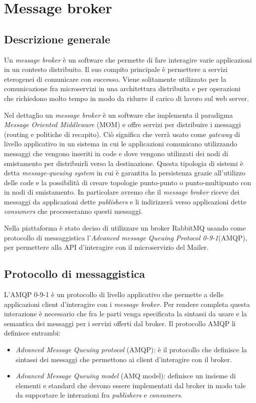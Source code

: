 \section{Message broker}
\subsection{Descrizione generale}
Un \textit{message broker} è un software che permette di fare interagire varie applicazioni in
un contesto distribuito. Il suo compito principale è permettere a servizi eterogenei di comunicare con successo.
Viene solitamente utilizzato per la comunicazione fra microservizi in una architettura distribuita
e per operazioni che richiedono molto tempo in modo da ridurre il carico di lavoro sul web server.

Nel dettaglio un \textit{message broker} è un software che implementa il paradigma \textit{Message Oriented Middleware} (MOM) e offre servizi per distribuire i messaggi (routing e politiche di recapito).
Ciò significa che verrà usato come \textit{gateway} di livello applicativo in un sistema in cui le applicazioni comunicano utilizzando messaggi
che vengono inseriti in code e dove vengono utilizzati dei nodi di smistamento per distribuirli verso la destinazione.
Questa tipologia di sistemi è detta \textit{message-queuing system}\cite{MessageBroker-Book} in cui è garantita la persistenza
grazie all'utilizzo delle code e la possibilità di creare topologie punto-punto o punto-multipunto con in nodi di smistamento.
In particolare avremo che il \textit{message broker} riceve dei messaggi da applicazioni dette \textit{publishers} e li indirizzerà verso applicazioni dette \textit{consumers} che processeranno questi messaggi.

Nella piattaforma è stato deciso di utilizzare un broker RabbitMQ\cite{rabbitMQ} usando come protocollo di messaggistica l'\textit{Advanced message Queuing Protocol 0-9-1}(AMQP)\cite{amqp},
per permettere alla API d'interagire con il microservizio del Mailer.

\subsection{Protocollo di messaggistica}
L'AMQP 0-9-1 è un protocollo di livello applicativo che permette a delle applicazioni client d'interagire con i \textit{message broker}.
Per rendere completa questa interazione è necessario che fra le parti venga specificata la sintassi da usare e la semantica dei messaggi per i servizi offerti dal broker.
Il protocollo AMQP li definisce entrambi:
\begin{itemize}
    \itemsep0em
    \item \textit{Advanced Message Queuing protocol} (AMQP): è il protocollo che definisce la sintassi dei messaggi che permettono ai client d'interagire con il broker.
    \item \textit{Advanced Message Queuing model} (AMQ model): definisce un insieme di elementi e standard che devono essere implementati dal broker in modo tale da supportare le interazioni fra \textit{publishers} e \textit{consumers}.
\end{itemize}

